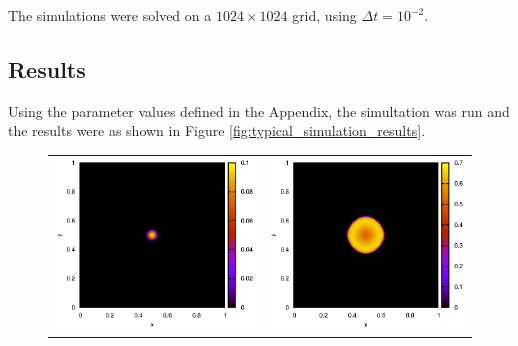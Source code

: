 \documentclass{llncs}
\begin{document}
    The simulations were solved on a $1024 \times 1024$ grid, using $\Delta t = 10^{-2}$.
     
  
  \subsection{Results}
    Using the parameter values defined in the Appendix, the simultation was run and the results were as shown in Figure \ref{fig:typical_simulation_results}.

    \begin{figure}[h!tb]
      \begin{center}
      \begin{tabular}{c c}
        \includegraphics[scale = 0.5]{typicalSim-t0.eps}&
        \includegraphics[scale = 0.5]{typicalSim-t10.eps}\\

\end{tabular}
\end{center}
\end{figure}
\end{document}
